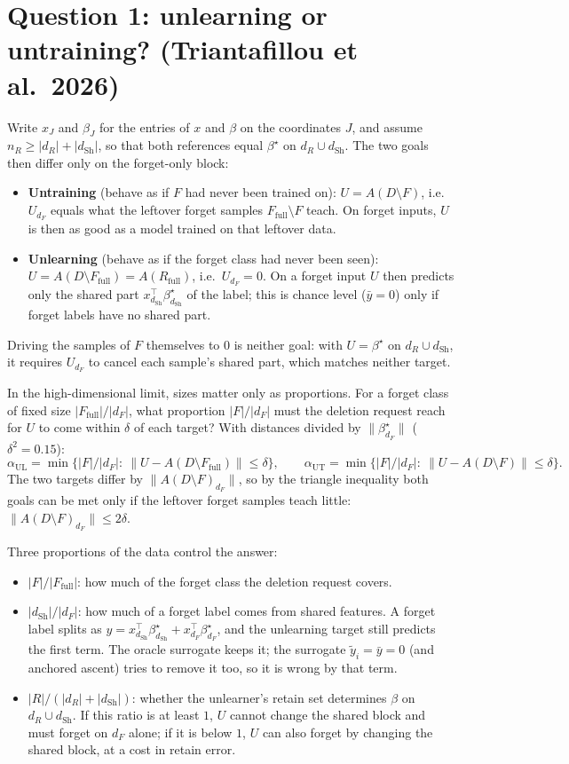 \documentclass[10pt]{article}
\newcommand{\Rf}{R_{\mathrm{full}}}\newcommand{\Ff}{F_{\mathrm{full}}}\newcommand{\dSh}{d_{\mathrm{Sh}}}
\begin{document}
\section{Question 1: unlearning or untraining? (Triantafillou et al.\ 2026)}
Write $x_J$ and $\beta_J$ for the entries of $x$ and $\beta$ on the coordinates $J$, and assume $n_R\ge|d_R|+|\dSh|$, so that both references equal $\beta^\star$ on $d_R\cup\dSh$. The two goals then differ only on the forget-only block:
\begin{itemize}\itemsep1pt
\item \textbf{Untraining} (behave as if $F$ had never been trained on): $U=A(D\setminus F)$, i.e.\ $U_{d_F}$ equals what the leftover forget samples $\Ff\setminus F$ teach. On forget inputs, $U$ is then as good as a model trained on that leftover data.
\item \textbf{Unlearning} (behave as if the forget class had never been seen): $U=A(D\setminus\Ff)=A(\Rf)$, i.e.\ $U_{d_F}=0$. On a forget input $U$ then predicts only the shared part $x_{\dSh}^\top\beta^\star_{\dSh}$ of the label; this is chance level ($\bar y=0$) only if forget labels have no shared part.
\end{itemize}
Driving the samples of $F$ themselves to $0$ is neither goal: with $U=\beta^\star$ on $d_R\cup\dSh$, it requires $U_{d_F}$ to cancel each sample's shared part, which matches neither target.

In the high-dimensional limit, sizes matter only as proportions. For a forget class of fixed size $|\Ff|/|d_F|$, what proportion $|F|/|d_F|$ must the deletion request reach for $U$ to come within $\delta$ of each target? With distances divided by $\|\beta^\star_{d_F}\|$ ($\delta^2=0.15$):
\[
\alpha_{\mathrm{UL}}=\min\big\{|F|/|d_F|:\ \|U-A(D\setminus\Ff)\|\le\delta\big\},\qquad
\alpha_{\mathrm{UT}}=\min\big\{|F|/|d_F|:\ \|U-A(D\setminus F)\|\le\delta\big\}.
\]
The two targets differ by $\|A(D\setminus F)_{d_F}\|$, so by the triangle inequality both goals can be met only if the leftover forget samples teach little: $\|A(D\setminus F)_{d_F}\|\le2\delta$.

Three proportions of the data control the answer:
\begin{itemize}\itemsep1pt
\item $|F|/|\Ff|$: how much of the forget class the deletion request covers.
\item $|\dSh|/|d_F|$: how much of a forget label comes from shared features. A forget label splits as $y=x_{\dSh}^\top\beta^\star_{\dSh}+x_{d_F}^\top\beta^\star_{d_F}$, and the unlearning target still predicts the first term. The oracle surrogate keeps it; the surrogate $\tilde y_i=\bar y=0$ (and anchored ascent) tries to remove it too, so it is wrong by that term.
\item $|R|/(|d_R|+|\dSh|)$: whether the unlearner's retain set determines $\beta$ on $d_R\cup\dSh$. If this ratio is at least $1$, $U$ cannot change the shared block and must forget on $d_F$ alone; if it is below $1$, $U$ can also forget by changing the shared block, at a cost in retain error.
\end{itemize}
\end{document}
